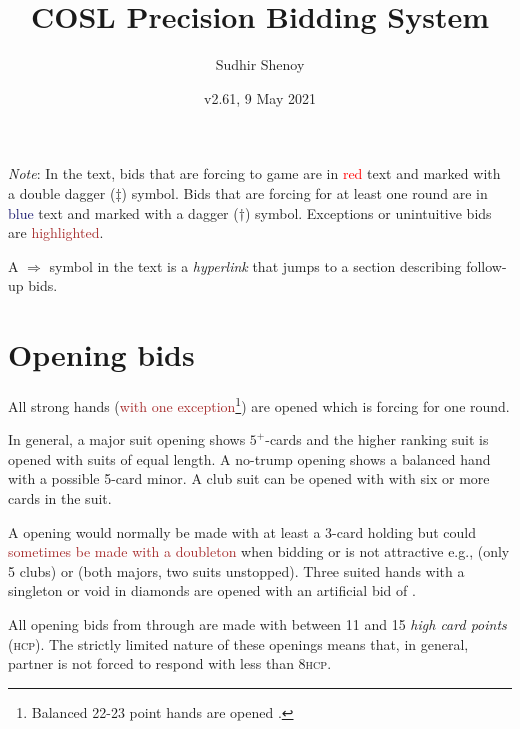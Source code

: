 \documentclass[a4paper,article,oneside]{memoir}
\newcommand{\gap}{\vspace{\baselineskip}}
\newcommand{\hcp}{\textsc{hcp}}
\newcommand{\excp}[1]{\textcolor{Brown}{#1}} %
\begin{document}
\title{COSL Precision Bidding System}
\author{Sudhir Shenoy}
\date{v2.61, 9 May 2021}
\maketitle

\tableofcontents

\gap

\emph{Note}: In the text, bids that are forcing to game are in
\textcolor{Red}{red} text and marked with a double dagger ($\ddagger$)
symbol. Bids that are forcing for at least one round are in
\textcolor{MidnightBlue}{blue} text and marked with a dagger ($\dagger$)
symbol. Exceptions or unintuitive bids are \excp{highlighted}.

A $\Rightarrow$ symbol in the text is a \emph{hyperlink} that jumps to
a section describing follow-up bids.

\pagebreak

\section{Opening bids}

All strong hands (\excp{with one exception\footnote{Balanced 22-23 point
  hands are opened \nt{2}.}}) are opened  which is forcing for
one round.

In general, a major suit opening shows $5^+$-cards and the higher
ranking suit is opened with suits of equal length. A no-trump opening
shows a balanced hand with a possible 5-card minor. A club suit can be
opened with  with six or more cards in the suit.

A  opening would normally be made with at least a 3-card holding
but could \excp{sometimes be made with a doubleton} when bidding  or
 is not attractive e.g.,  (only 5 clubs)
or  (both majors, two suits unstopped). Three
suited hands with a singleton or void in diamonds are opened with an
artificial bid of .

All opening bids from  through  are made with between 11
and 15 \emph{high card points} (\hcp). The strictly limited nature of
these openings means that, in general, partner is not forced to
respond with less than 8\hcp.
\end{document}
